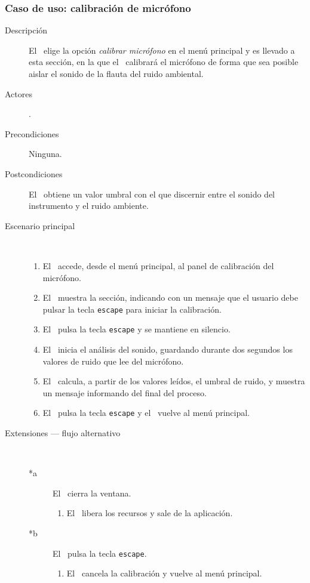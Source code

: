 \subsubsection{Caso de uso: calibración de micrófono}
\begin{description}
\item [Descripción] El \jugador\ elige la opción \textit{calibrar micrófono} en
  el menú principal y es llevado a esta sección, en la que el \sistema\ calibrará
  el micrófono de forma que sea posible aislar el sonido de la flauta del ruido
  ambiental.
\item [Actores] \jugador.
\item [Precondiciones] Ninguna.
\item [Postcondiciones] El \sistema\ obtiene un valor umbral con el que
  discernir entre el sonido del instrumento y el ruido ambiente.
\item [Escenario principal] $\quad$
  \begin{enumerate}
  \item El \jugador\ accede, desde el menú principal, al panel de calibración del micrófono.
  \item El \sistema\ muestra la sección, indicando con un mensaje que el usuario
    debe pulsar la tecla \texttt{escape} para iniciar la calibración.
  \item El \jugador\ pulsa la tecla \texttt{escape} y se mantiene en silencio.
  \item El \sistema\ inicia el análisis del sonido, guardando durante dos
    segundos los valores de ruido que lee del micrófono.
  \item El \sistema\ calcula, a partir de los valores leídos, el umbral de
    ruido, y muestra un mensaje informando del final del proceso.
  \item El \jugador\ pulsa la tecla \texttt{escape} y el \sistema\ vuelve al
    menú principal.
  \end{enumerate}
\item[Extensiones --- flujo alternativo] $\quad$
  \begin{description}

  \item [*a] El \jugador\ cierra la ventana.
    \begin{enumerate}
    \item El \sistema\ libera los recursos y sale de la aplicación.
    \end{enumerate}

  \item[*b] El \jugador\ pulsa la tecla \texttt{escape}.
    \begin{enumerate}
    \item El \sistema\ cancela la calibración y vuelve al menú principal.
    \end{enumerate}


\end{description}
\end{description}

